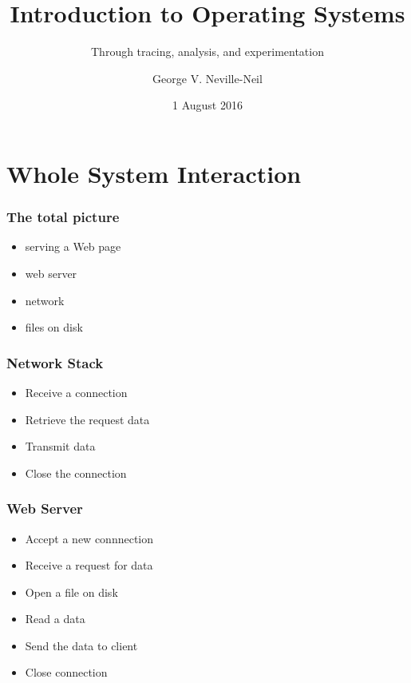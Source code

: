 
\usepackage[english]{babel}
\usepackage[latin1]{inputenc}
\usepackage{graphicx}
\usepackage{times}
\usepackage[T1]{fontenc}
\usepackage{fancyvrb}
\usepackage{listings}


\title{Introduction to Operating Systems}
\subtitle{Through tracing, analysis, and experimentation}
\author{George V. Neville-Neil}
\date{1 August 2016}

\begin{frame}
  \titlepage
\end{frame}

\section{Whole System Interaction}
\label{sec:whole}

\begin{frame}
  \frametitle{The total picture}
  \begin{itemize}
  \item serving a Web page
  \item web server
  \item network 
  \item files on disk
  \end{itemize}
\end{frame}

\begin{frame}
  \frametitle{Network Stack}
  \begin{itemize}
  \item Receive a connection
  \item Retrieve the request data
  \item Transmit data
  \item Close the connection
  \end{itemize}
\end{frame}

\begin{frame}
  \frametitle{Web Server}
  \begin{itemize}
  \item Accept a new connnection
  \item Receive a request for data
  \item Open a file on disk
  \item Read a data
  \item Send the data to client
  \item Close connection
  \end{itemize}
\end{frame}

